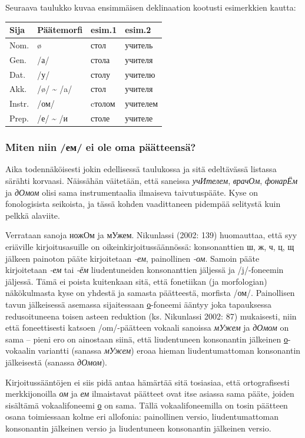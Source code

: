 \documentclass[]{scrreprt}
\begin{document}
Seuraava taulukko kuvaa ensimmäisen deklinaation kootusti esimerkkien
kautta:

\begin{longtable}[c]{@{}llll@{}}
\toprule
Sija & Päätemorfi & esim.1 & esim.2\tabularnewline
\midrule
\endhead
Nom. & ø & стол & учитель\tabularnewline
Gen. & /а/ & стола & учителя\tabularnewline
Dat. & /у/ & столу & учителю\tabularnewline
Akk. & /ø/ \textasciitilde{} /a/ & стол & учителя\tabularnewline
Instr. & /ом/ & cтолом & учителем\tabularnewline
Prep. & /е/ \textasciitilde{} /и & столе & учителе\tabularnewline
\bottomrule
\end{longtable}

\subsubsection{Miten niin /ем/ ei ole oma
päätteensä?}\label{miten-niin-ux435ux43c-ei-ole-oma-puxe4uxe4tteensuxe4}

Aika todennäköisesti jokin edellisessä taulukossa ja sitä edeltävässä
listassa särähti korvaasi. Näissähän väitetään, että saneissa
\emph{учИтелем}, \emph{врачОм}, \emph{фонарЁм} ja \emph{дОмом} olisi
sama instrumentaalia ilmaiseva taivutuspääte. Kyse on fonologisista
seikoista, ja tässä kohden vaadittaneen pidempää selitystä kuin pelkkä
alaviite.

Verrataan sanoja ножОм ja мУжем. Nikunlassi (2002: 139) huomauttaa, että
syy eriäville kirjoitusasuille on oikeinkirjoitussäännössä:
konsonanttien ш, ж, ч, ц, щ jälkeen painoton pääte kirjoitetaan
\emph{-ем}, painollinen \emph{-ом}. Samoin pääte kirjoitetaan \emph{-ем}
tai \emph{-ём} liudentuneiden konsonanttien jäljessä ja /j/-foneemin
jäljessä. Tämä ei poista kuitenkaan sitä, että fonetiikan (ja
morfologian) näkökulmasta kyse on yhdestä ja samasta päätteestä,
morfista /ом/. Painollisen tavun jälkeisessä asemassa sijaitessaan
\hyperref[ux43e]{о}-foneemi ääntyy joka tapauksessa redusoituneena
toisen asteen reduktion (ks. Nikunlassi 2002: 87) mukaisesti, niin että
foneettisesti katsoen /om/-päätteen vokaali sanoissa \emph{мУжем} ja
\emph{дОмом} on sama -- pieni ero on ainostaan siinä, että liudentuneen
konsonantin jälkeinen \hyperref[ux43e]{о}-vokaalin variantti (sanassa
\emph{мУжем}) eroaa hieman liudentumattoman konsonantin jälkeisestä
(sanassa \emph{дОмом}).

Kirjoitussääntöjen ei siis pidä antaa hämärtää sitä tosiasiaa, että
ortografisesti merkkijonoilla \emph{ом} ja \emph{ем} ilmaistavat
päätteet ovat itse asiassa sama pääte, joiden sisältämä vokaalifoneemi
\hyperref[ux43e]{о} on sama. Tällä vokaalifoneemilla on tosin päätteen
osana toimiessaan kolme eri allofonia: painollinen versio,
liudentumattoman konsonantin jälkeinen versio ja liudentuneen
konsonantin jälkeinen versio.
\end{document}
